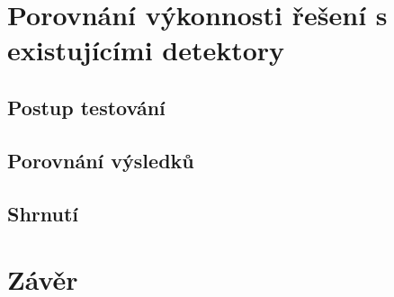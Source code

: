 
\chapter{Porovnání výkonnosti řešení s existujícími detektory}
\label{kapitola:porovnani_vykonnosti}


\section{Postup testování}


\section{Porovnání výsledků}


\section{Shrnutí}


\chapter{Závěr}
\label{kapitola:zaver}
